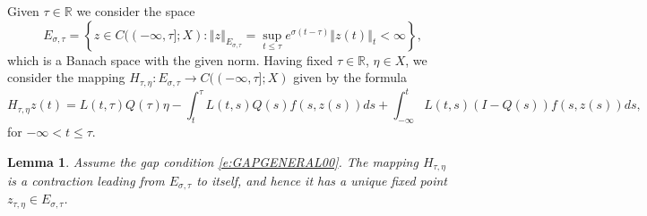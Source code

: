 \documentclass[a4paper,11pt,reqno]{amsart}
\theoremstyle{plain}
\newtheorem{lem}{Lemma}[section]
\theoremstyle{definition}
\numberwithin{equation}{section}
\newcommand{\R}{\mathbb{R}}
\newcommand{\norm}[1]{\left\Vert#1\right\Vert}
\renewcommand{\leq}{\leqslant}
\begin{document}
Given $\tau\in\R$ we consider the space 
$$E_{\sigma,\tau}=\left\{z\in C((-\infty,\tau];X)\colon \norm{z}_{E_{\sigma,\tau}}=\sup_{t\leq\tau}e^{\sigma(t-\tau)}\norm{z(t)}_{t}<\infty\right\},$$
which is a Banach space with the given norm. Having fixed $\tau\in\R$, $\eta\in X$, we consider the mapping $H_{\tau,\eta}\colon E_{\sigma,\tau}\to C((-\infty,\tau];X)$ given by the formula
$$H_{\tau,\eta}z(t)=L(t,\tau)Q(\tau)\eta-\int_{t}^{\tau}L(t,s)Q(s)f(s,z(s))ds+\int_{-\infty}^{t}L(t,s)(I-Q(s))f(s,z(s))ds,$$
for  $-\infty<t\leq\tau$.
\begin{lem}\label{lem:fixed_point}
	Assume the gap condition \eqref{e:GAPGENERAL00}. The mapping $H_{\tau,\eta}$ is a contraction leading from $E_{\sigma,\tau}$ to itself, and hence it has a unique fixed point $z_{\tau,\eta}\in E_{\sigma,\tau}$. 
\end{lem}
\end{document}
